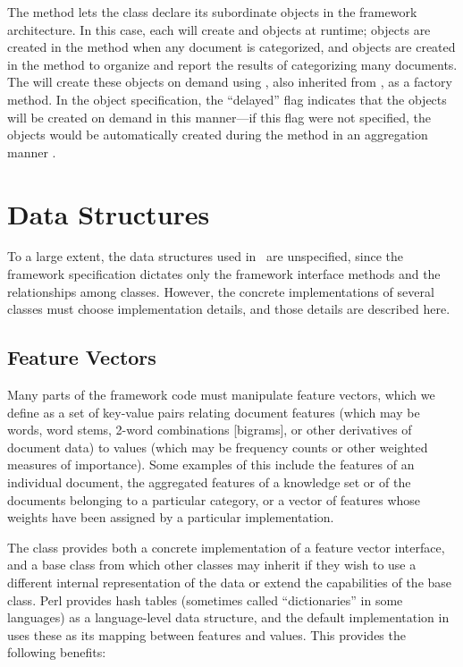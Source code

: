 The  method lets the  class
declare its subordinate objects in the framework architecture.  In
this case, each  will create  and
 objects at runtime;  objects are
created in the  method when any document is
categorized, and  objects are created in the
 method to organize and report the
results of categorizing many documents.  The  will
create these objects on demand using ,
also inherited from , as a factory method.  In
the object specification, the ``delayed'' flag indicates that the
objects will be created on demand in this manner---if this flag were
not specified, the objects would be automatically created during the
 method in an aggregation manner \cite[p. 22]{gamma:95}.


\section{Data Structures}

To a large extent, the data structures used in \aicat\ are
unspecified, since the framework specification dictates only the
framework interface methods and the relationships among classes.
However, the concrete implementations of several classes must choose
implementation details, and those details are described here.

\subsection{Feature Vectors}
\label{imp-featurevectors}

Many parts of the framework code must manipulate feature vectors,
which we define as a set of key-value pairs relating document features
(which may be words, word stems, 2-word combinations [bigrams], or
other derivatives of document data) to values (which may be frequency
counts or other weighted measures of importance).  Some examples of
this include the features of an individual document, the aggregated
features of a knowledge set or of the documents belonging to a
particular category, or a vector of features whose weights have been
assigned by a particular  implementation.

The  class provides both a concrete
implementation of a feature vector interface, and a base class from
which other classes may inherit if they wish to use a different
internal representation of the data or extend the capabilities of the
base class.  Perl provides hash tables (sometimes called
``dictionaries'' in some languages) as a language-level data
structure, and the default implementation in 
uses these as its mapping between features and values.  This provides
the following benefits:

